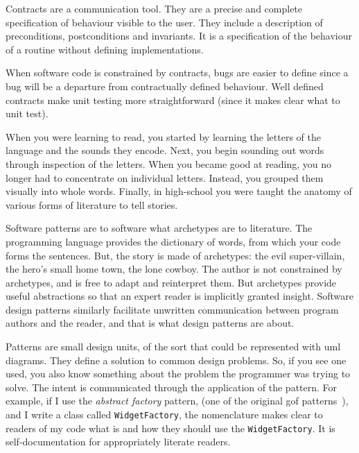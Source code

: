 %
Contracts are a communication tool. They are a precise and complete
specification of behaviour visible to the user. They include a description of
preconditions, postconditions and invariants. It is a specification of the
behaviour of a routine without defining implementations.

When software code is constrained by contracts, bugs are easier to define since
a bug will be a departure from contractually defined behaviour. Well defined
contracts make unit testing more straightforward (since it makes clear what to
unit test).

When you were learning to read, you started by learning the letters of the
language and the sounds they encode. Next, you begin sounding out words through
inspection of the letters. When you became good at reading, you no longer had to
concentrate on individual letters. Instead, you grouped them visually into whole
words. Finally, in high-school you were taught the anatomy of various forms of
literature to tell stories.

Software patterns are to software what archetypes are to literature. The
programming language provides the dictionary of words, from which your code
forms the sentences. But, the story is made of archetypes: the evil
super-villain, the hero's small home town, the lone cowboy. The author is not
constrained by archetypes, and is free to adapt and reinterpret them. But
archetypes provide useful abstractions so that an expert reader is implicitly
granted insight. Software design patterns similarly facilitate unwritten
communication between program authors and the reader, and that is what design
patterns are about.

Patterns are small design units, of the sort that could be represented with
\ac{uml} diagrams. They define a solution to common design problems. So, if you
see one used, you also know something about the problem the programmer was
trying to solve. The intent is communicated through the application of the
pattern. For example, if I use the \emph{abstract factory} pattern, (one of the
original \ac{gof} patterns~\cite{GOF}), and I write a class called
\verb|WidgetFactory|, the nomenclature makes clear to readers of my code what is
and how they should use the \verb|WidgetFactory|. It is self-documentation for
appropriately literate readers.

